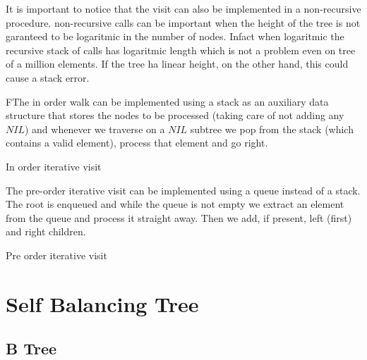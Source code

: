 It is important to notice that the visit can also be implemented in a non-recursive procedure. non-recursive calls can be important when the height of the tree is not garanteed to be logaritmic in the number of nodes. Infact when logaritmic the recursive stack of calls has logaritmic length which is not a problem even on tree of a million elements. If the tree ha linear height, on the other hand, this could cause a stack error.

FThe in order walk can be implemented using a stack as an auxiliary data structure that stores the nodes to be processed (taking care of not adding any $NIL$) and whenever we traverse on a $NIL$ subtree we pop from the stack (which contains a valid element), process that element and go right.

\begin{algorithm}
\caption{In order iterative visit }\label{alg:pst}
\end{algorithm}

The pre-order iterative visit can be implemented using a queue instead of a stack. The root is enqueued and while the queue is not empty we extract an element from the queue and process it straight away. Then we add, if present, left (first) and right children.

\begin{algorithm}
\caption{Pre order iterative visit }\label{alg:pre_iter}
\end{algorithm}




\section{Self Balancing Tree}
\subsection{B Tree}
